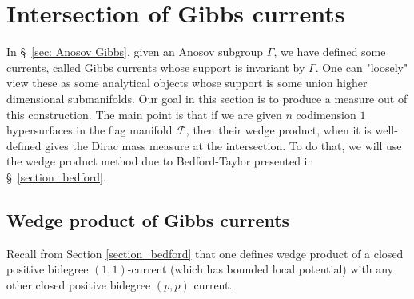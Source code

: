 \documentclass[12pt]{amsbook}%
\newtheorem{cor}[thm]{Corollary}
\theoremstyle{definition}
\theoremstyle{remark}
\numberwithin{section}{chapter}
\numberwithin{subsection}{section}
\numberwithin{figure}{chapter}
\DeclareMathOperator{\Th}{Th}
\newcommand\bac[1]{{\color{blue} #1} }
\newcommand\intcur[1]{\llbracket #1 \rrbracket}
\def\cF{{\mathscr{F}}}
\def\kap{}
\begin{document}
{{   

\chapter{Intersection of Gibbs currents}
\label{sec:intersection_Gibbs}
In  \S~\ref{sec: Anosov Gibbs}, given an Anosov subgroup $\Gamma$, we have defined some currents, called Gibbs currents whose support is invariant by $\Gamma$.  One can "loosely" view these as some analytical objects whose support is some union  higher dimensional  
 submanifolds. Our goal in this section is to produce a measure out of this construction. The main point is that if we are given $n$ codimension $1$ hypersurfaces in the flag manifold $\cF$, then their wedge product, when it is well-defined gives the Dirac mass measure at the intersection. To do that, we will use the wedge product method due to Bedford-Taylor presented in \S~\ref{section_bedford}. 
%  


\section{Wedge product  of Gibbs currents}

Recall from Section \ref{section_bedford} that one defines wedge product of a closed positive bidegree $(1,1)$-current (which has bounded local potential) 
with any other closed positive bidegree $(p,p)$ current. 


%
%
%
%

}}
\end{document}
